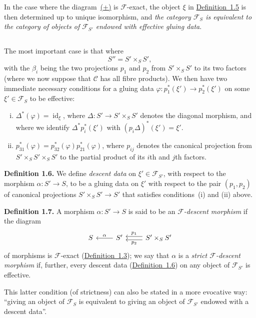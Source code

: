 \documentclass{article}
\newenvironment{rmenv}[1]
  {\phantomsection\par\medskip\noindent\textbf{#1.}\rmfamily}
  {\medskip}
\renewcommand{\cal}[1]{{\mathcal{#1}}}
\DeclareMathOperator{\id}{id}
\newcommand{\oldpage}[1]{\marginpar{\footnotesize$\Big\vert$ \textit{p.~#1}}}
\begin{document}
In the case where the diagram~\hyperref[equation-definition:A.1.3]{(+)} is $\cal{F}$-exact, the object $\xi$ in \hyperref[definition:A.1.5]{Definition~1.5} is then determined up to unique isomorphism, and \emph{the category $\cal{F}_S$ is equivalent to the category of objects of $\cal{F}_{S'}$ endowed with effective gluing data}.


\subsection{}
\label{A.1.c}
The most important case is that where
\[
  S'' = S' \times_S S',
\]
with the $\beta_i$ being the two projections $p_1$ and $p_2$ from $S'\times_S S'$ to its two factors (where we now suppose that $\cal{C}$ has all fibre products).
We then have two immediate necessary conditions for a gluing data $\varphi\colon p_1^*(\xi')\to p_2^*(\xi')$ on some $\xi'\in\cal{F}_S$ to be effective:
\begin{enumerate}[(i)]
  \item $\Delta^*(\varphi) = \id_\xi$, where $\Delta\colon S'\to S'\times_S S'$ denotes the diagonal morphism, and where we identify $\Delta^* p_i^*(\xi')$ with $(p_i\Delta)^*(\xi')=\xi'$.
  \item $p_{31}^*(\varphi) = p_{32}^*(\varphi)p_{21}^*(\varphi)$,
\oldpage{190-05}
  where $p_{ij}$ denotes the canonical projection from $S'\times_S S'\times_S S'$ to the partial product of its $i$th and $j$th factors.
\end{enumerate}

\begin{rmenv}{Definition 1.6}
\label{definition:A.1.6}
  We define \emph{descent data} on $\xi'\in\cal{F}_{S'}$, with respect to the morphism $\alpha\colon S'\to S$, to be a gluing data on $\xi'$ with respect to the pair $(p_1,p_2)$ of canonical projections $S'\times_S S'\to S'$ that satisfies conditions~(i) and (ii) above.
\end{rmenv}

\begin{rmenv}{Definition 1.7}
\label{definition:A.1.7}
  A morphism $\alpha\colon S'\to S$ is said to be an \emph{$\cal{F}$-descent morphism} if the diagram
  \[
    \begin{tikzcd}
      S
      & S' \lar[swap,"\alpha"]
      & S'\times_S S' \lar[shift left=1,"p_2"] \lar[shift right=1,swap,"p_1"]
    \end{tikzcd}
  \]
  of morphisms is $\cal{F}$-exact (\hyperref[definition:A.1.3]{Definition~1.3});
  we say that $\alpha$ is a \emph{strict $\cal{F}$-descent morphism} if, further, every descent data (\hyperref[definition:A.1.6]{Definition~1.6}) on any object of $\cal{F}_{S'}$ is effective.

  This latter condition (of strictness) can also be stated in a more evocative way:
  ``giving an object of $\cal{F}_S$ is equivalent to giving an object of $\cal{F}_{S'}$ endowed with a descent data''.
\end{rmenv}
\end{document}

